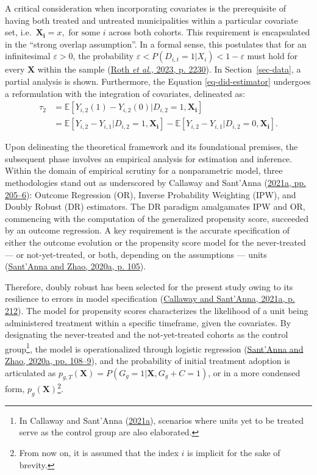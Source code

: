 \documentclass[12pt, a4paper, twoside]{article}
\numberwithin{equation}{subsection} %
\begin{document}
A critical consideration when incorporating covariates is the
prerequisite of having both treated and untreated municipalities within
a particular covariate set,
i.e.~\(\boldsymbol{X_i} = x, \text{ for some } i\) across both cohorts.
This requirement is encapsulated in the ``strong overlap assumption''.
In a formal sense, this postulates that for an infinitesimal
\(\varepsilon > 0\), the probability
\(\varepsilon < P(D_{i,t} = 1 | X_i) < 1 - \varepsilon\) must hold for
every \(\boldsymbol{X}\) within the sample
(\protect\hyperlink{ref-roth_whats_2023}{Roth \emph{et al.}, 2023, p.
2230}). In Section~\ref{sec-data}, a partial analysis is shown.
Furthermore, the Equation \eqref{eq-did-estimator} undergoes a
reformulation with the integration of covariates, delineated as:
\begin{equation} \label{eq-did-estimator-covariates}
\begin{split}
    \tau_2 & = \mathbb{E}[Y_{i,2}(1) - Y_{i,2}(0) | D_{i,2} = 1, \boldsymbol{X_i}] \\
     & = \mathbb{E}[Y_{i,2} - Y_{i,1}| D_{i,2} = 1, \boldsymbol{X_i}] - \mathbb{E}[Y_{i,2} - Y_{i,1} | D_{i,2} = 0, \boldsymbol{X_i}].
\end{split}
\end{equation}

Upon delineating the theoretical framework and its foundational
premises, the subsequent phase involves an empirical analysis for
estimation and inference. Within the domain of empirical scrutiny for a
nonparametric model, three methodologies stand out as underscored by
Callaway and Sant'Anna (\protect\hyperlink{ref-CALLAWAY2021200}{2021a,
pp. 205--6}): Outcome Regression (OR), Inverse Probability Weighting
(IPW), and Doubly Robust (DR) estimators. The DR paradigm amalgamates
IPW and OR, commencing with the computation of the generalized
propensity score, succeeded by an outcome regression. A key requirement
is the accurate specification of either the outcome evolution or the
propensity score model for the never-treated --- or not-yet-treated, or
both, depending on the assumptions --- units
(\protect\hyperlink{ref-SANTANNA2020101}{Sant'Anna and Zhao, 2020a, p.
105}).

Therefore, doubly robust has been selected for the present study owing
to its resilience to errors in model specification
(\protect\hyperlink{ref-CALLAWAY2021200}{Callaway and Sant'Anna, 2021a,
p. 212}). The model for propensity scores characterizes the likelihood
of a unit being administered treatment within a specific timeframe,
given the covariates. By designating the never-treated and the
not-yet-treated cohorts as the control group\footnote{In Callaway and
  Sant'Anna (\protect\hyperlink{ref-CALLAWAY2021200}{2021a}), scenarios
  where units yet to be treated serve as the control group are also
  elaborated.}, the model is operationalized through logistic regression
(\protect\hyperlink{ref-SANTANNA2020101}{Sant'Anna and Zhao, 2020a, pp.
108--9}), and the probability of initial treatment adoption is
articulated as
\(p_{g,T}(\boldsymbol{X}) = P(G_g=1 | \boldsymbol{X}, G_g + C = 1)\), or
in a more condensed form, \(p_{g}(\boldsymbol{X})\)\footnote{From now
  on, it is assumed that the index \(i\) is implicit for the sake of
  brevity.}.
\end{document}
